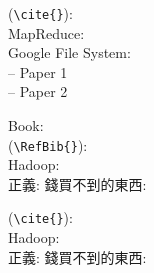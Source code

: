 (\verb|\cite{}|):\\
MapReduce: \cite{testpage:bib:paper:mapreduce}\\
Google File System:\\
-- Paper 1 \cite{testpage:bib:paper:gfs}\\
-- Paper 2 \cite{testpage:bib:paper:gfs2}

Book:\\
(\verb|\RefBib{}|):\\
Hadoop: \\
正義: 
錢買不到的東西: 

(\verb|\cite{}|):\\
Hadoop: \cite{testpage:bib:book:hadoop}\\
正義: \cite{testpage:bib:book:justice}
錢買不到的東西: \cite{testpage:bib:book:whatMoneyCantBuy}

\EndChapter
